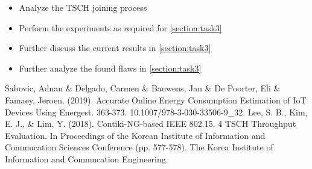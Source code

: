 \documentclass[conference]{IEEEtran}
\begin{document}
\label{section:futurework}
\begin{itemize}
\item Analyze the TSCH joining process
\item Perform the experiments as required for \ref{section:task3}
\item Further discuss the current results in \ref{section:task3}
\item Further analyze the found flaws in \ref{section:task3}
\end{itemize}

\begin{thebibliography}{00}
 Sabovic, Adnan \& Delgado, Carmen \& Bauwens, Jan \& De Poorter, Eli \& Famaey, Jeroen. (2019). Accurate Online Energy Consumption Estimation of IoT Devices Using Energest. 363-373. 10.1007/978-3-030-33506-9\_32. 
 Lee, S. B., Kim, E. J., \& Lim, Y. (2018). Contiki-NG-based IEEE 802.15. 4 TSCH Throughput Evaluation. In Proceedings of the Korean Institute of Information and Commucation Sciences Conference (pp. 577-578). The Korea Institute of Information and Commucation Engineering.
\end{thebibliography}
\end{document}
